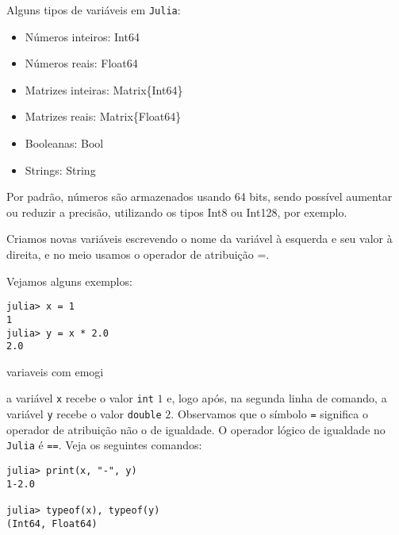 Alguns tipos de variáveis em \verb+Julia+:

\begin{itemize}
\item Números inteiros: Int64
\item Números reais: Float64
\item Matrizes inteiras: Matrix\{Int64\}
\item Matrizes reais: Matrix\{Float64\}
\item Booleanas: Bool
\item Strings: String
\end{itemize}

Por padrão, números são armazenados usando 64 bits, sendo possível aumentar ou reduzir a precisão, utilizando os tipos Int8 ou Int128, por exemplo.



























Criamos novas variáveis escrevendo o nome da variável à esquerda e seu valor à direita, e no meio usamos o operador de atribuição =.

Vejamos alguns exemplos:

\begin{lstlisting}
julia> x = 1
1
julia> y = x * 2.0
2.0
\end{lstlisting}



variaveis com emogi




a variável \verb+x+ recebe o valor \verb+int+ $1$ e, logo após, na segunda linha de comando, a variável \verb+y+ recebe o valor \verb+double+ $2$. Observamos que o símbolo \verb+=+ significa o operador de atribuição não o de igualdade. O operador lógico de igualdade no \verb+Julia+ é \verb+==+. Veja os seguintes comandos:

\begin{lstlisting}
julia> print(x, "-", y)
1-2.0

julia> typeof(x), typeof(y)
(Int64, Float64)
\end{lstlisting}

